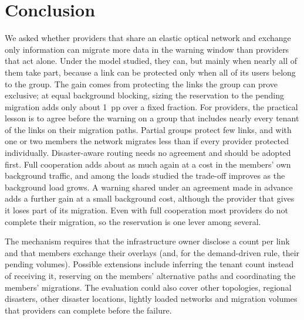\documentclass[11pt,a4paper]{article}
\theoremstyle{definition}
\begin{document}
\section{Conclusion}
\label{sec:conclusion}

We asked whether providers that share an elastic optical network and exchange only information can migrate more data in the warning window than providers that act alone.
Under the model studied, they can, but mainly when nearly all of them take part, because a link can be protected only when all of its users belong to the group.
The gain comes from protecting the links the group can prove exclusive; at equal background blocking, sizing the reservation to the pending migration adds only about 1~pp over a fixed fraction.
For providers, the practical lesson is to agree before the warning on a group that includes nearly every tenant of the links on their migration paths. Partial groups protect few links, and with one or two members the network migrates less than if every provider protected individually.
Disaster-aware routing needs no agreement and should be adopted first. Full cooperation adds about as much again at a cost in the members' own background traffic, and among the loads studied the trade-off improves as the background load grows. A warning shared under an agreement made in advance adds a further gain at a small background cost, although the provider that gives it loses part of its migration.
Even with full cooperation most providers do not complete their migration, so the reservation is one lever among several.

The mechanism requires that the infrastructure owner disclose a count per link and that members exchange their overlays (and, for the demand-driven rule, their pending volumes).
Possible extensions include inferring the tenant count instead of receiving it, reserving on the members' alternative paths and coordinating the members' migrations.
The evaluation could also cover other topologies, regional disasters, other disaster locations, lightly loaded networks and migration volumes that providers can complete before the failure.

{\small


}
\end{document}
